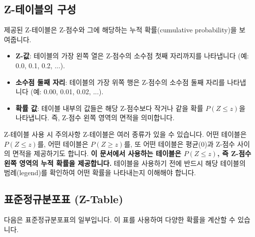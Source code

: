 \documentclass[11pt,a4paper]{article}
\begin{document}
\subsection*{Z-테이블의 구성}
제공된 Z-테이블은 Z-점수와 그에 해당하는 누적 확률(cumulative probability)을 보여줍니다.
\begin{itemize}
    \item \textbf{Z-값}: 테이블의 가장 왼쪽 열은 Z-점수의 소수점 첫째 자리까지를 나타냅니다 (예: 0.0, 0.1, 0.2, ...).
    \item \textbf{소수점 둘째 자리}: 테이블의 가장 위쪽 행은 Z-점수의 소수점 둘째 자리를 나타냅니다 (예: 0.00, 0.01, 0.02, ...).
    \item \textbf{확률 값}: 테이블 내부의 값들은 해당 Z-점수보다 작거나 같을 확률 $P(Z \le z)$을 나타냅니다. 즉, Z-점수 왼쪽 영역의 면적을 의미합니다.
\end{itemize}

\begin{warningbox}{Z-테이블 사용 시 주의사항}
Z-테이블은 여러 종류가 있을 수 있습니다. 어떤 테이블은 $P(Z \le z)$를, 어떤 테이블은 $P(Z \ge z)$를, 또 어떤 테이블은 평균(0)과 Z-점수 사이의 면적을 제공하기도 합니다. \textbf{이 문서에서 사용하는 테이블은 $P(Z \le z)$, 즉 Z-점수 왼쪽 영역의 누적 확률을 제공합니다.} 테이블을 사용하기 전에 반드시 해당 테이블의 범례(legend)를 확인하여 어떤 확률을 나타내는지 이해해야 합니다.
\end{warningbox}

\subsection*{표준정규분포표 (Z-Table)}
다음은 표준정규분포표의 일부입니다. 이 표를 사용하여 다양한 확률을 계산할 수 있습니다.
\end{document}
